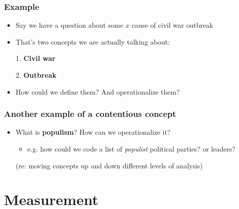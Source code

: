 \documentclass[aspectratio=43]{beamer}
\begin{document}
\begin{frame}
\frametitle{Example}
\centering

\begin{itemize}
  \item Say we have a question about some $x$ cause of civil war outbreak
  \item That's two concepts we are actually talking about:
  \item[1.] \textbf{Civil war}
  \item[2.] \textbf{Outbreak}
  \item How could we define them? And operationalize them?
\end{itemize}

\end{frame}

\begin{frame}
\frametitle{Another example of a contentious concept}
\centering

\begin{itemize}
  \item What is \textbf{populism}? How can we operationalize it?
  \begin{itemize}
    \item e.g. how could we code a list of \textit{populist} political parties? or leaders?
  \end{itemize}
  \item[]
  \item[] (re: moving concepts up and down different levels of analysis)
\end{itemize}

\end{frame}

\section{Measurement}
\end{document}

